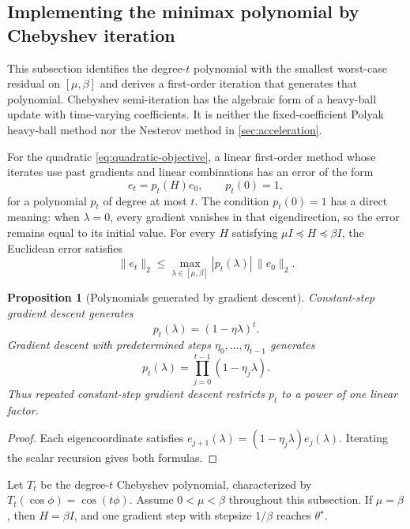 \documentclass[11pt,twoside]{article}
\newtheorem{proposition}[theorem]{Proposition}
\theoremstyle{definition}
\theoremstyle{remark}
\begin{document}
\subsection{Implementing the minimax polynomial by Chebyshev iteration}
\label{sec:chebyshev}

This subsection identifies the degree-$t$ polynomial with the smallest
worst-case residual on $[\mu,\beta]$ and derives a first-order iteration that
generates that polynomial. Chebyshev semi-iteration has the algebraic form of
a heavy-ball update with time-varying coefficients. It is neither the
fixed-coefficient Polyak heavy-ball method nor the Nesterov method in
\cref{sec:acceleration}.

For the quadratic \cref{eq:quadratic-objective}, a linear first-order method
whose iterates use past gradients and linear combinations has an error of the
form
\[
 e_t=p_t(H)e_0,
 \qquad p_t(0)=1,
\]
for a polynomial $p_t$ of degree at most $t$. The condition $p_t(0)=1$
has a direct meaning: when $\lambda=0$, every gradient vanishes in that
eigendirection, so the error remains equal to its initial value.
For every $H$ satisfying $\mu I\preceq H\preceq\beta I$, the Euclidean error
satisfies
\begin{equation}
 \|e_t\|_2
 \le
 \max_{\lambda\in[\mu,\beta]}|p_t(\lambda)|\,\|e_0\|_2.
 \label{eq:polynomial-worst-case}
\end{equation}

\begin{proposition}[Polynomials generated by gradient descent]
\label{prop:gd-polynomials}
Constant-step gradient descent generates
\[
 p_t(\lambda)=(1-\eta\lambda)^t.
\]
Gradient descent with predetermined steps $\eta_0,\ldots,\eta_{t-1}$
generates
\[
 p_t(\lambda)=\prod_{j=0}^{t-1}(1-\eta_j\lambda).
\]
Thus repeated constant-step gradient descent restricts $p_t$ to a power of
one linear factor.
\end{proposition}

\begin{proof}
Each eigencoordinate satisfies
$e_{j+1}(\lambda)=(1-\eta_j\lambda)e_j(\lambda)$. Iterating the scalar
recursion gives both formulas.
\end{proof}

Let $T_t$ be the degree-$t$ Chebyshev polynomial, characterized by
$T_t(\cos\phi)=\cos(t\phi)$.
Assume $0<\mu<\beta$ throughout this subsection. If $\mu=\beta$, then
$H=\beta I$, and one gradient step with stepsize $1/\beta$ reaches
$\theta^\star$.
\end{document}
